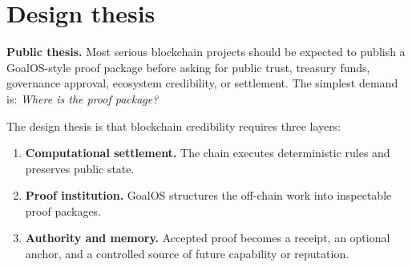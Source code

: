 \documentclass[11pt]{article}
\newcommand{\offchain}{off-chain}
\begin{document}
\section{Design thesis}

\begin{prbox}
\textbf{Public thesis.} Most serious blockchain projects should be expected to publish a GoalOS-style proof package before asking for public trust, treasury funds, governance approval, ecosystem credibility, or settlement. The simplest demand is: \emph{Where is the proof package?}
\end{prbox}

The design thesis is that blockchain credibility requires three layers:

\begin{enumerate}
  \item \textbf{Computational settlement.} The chain executes deterministic rules and preserves public state.
  \item \textbf{Proof institution.} GoalOS structures the \offchain{} work into inspectable proof packages.
  \item \textbf{Authority and memory.} Accepted proof becomes a receipt, an optional anchor, and a controlled source of future capability or reputation.
\end{enumerate}
\end{document}
